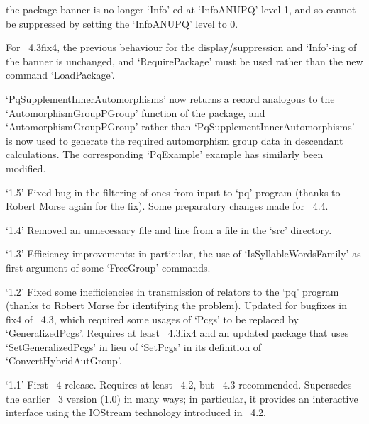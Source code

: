 \itemitem{--}
the package banner is no longer `Info'-ed at `InfoANUPQ' level 1, and  so
cannot be suppressed by setting the `InfoANUPQ' level to 0.

\item{}
For {\GAP}~4.3fix4, the previous behaviour  for  the  display/suppression
and `Info'-ing of the banner is unchanged, and `RequirePackage'  must  be
used rather than the new command `LoadPackage'.

\item{}
`PqSupplementInnerAutomorphisms' now returns a record  analogous  to  the
`AutomorphismGroupPGroup'  function  of  the  {\AutPGrp}   package,   and
`AutomorphismGroupPGroup' rather than `PqSupplementInnerAutomorphisms' is
now used to generate the required automorphism group data  in  descendant
calculations. The corresponding `PqExample' example  has  similarly  been
modified.

\item{`1.5'}
Fixed bug in the filtering of ones from input to `pq' program (thanks  to
Robert Morse again for  the  fix).  Some  preparatory  changes  made  for
{\GAP}~4.4.

\item{`1.4'}
Removed an unnecessary file and line from a file in the `src' directory.

\item{`1.3'}
Efficiency improvements: in particular, the use of `IsSyllableWordsFamily'
as first argument of some `FreeGroup' commands.

\item{`1.2'}
Fixed some inefficiencies in transmission of relators to the `pq' program
(thanks to  Robert  Morse  for  identifying  the  problem).  Updated  for
bugfixes in fix4 of {\GAP}~4.3, which required some usages of  `Pcgs'  to
be replaced by `GeneralizedPcgs'. Requires at least {\GAP}~4.3fix4 and an
updated {\AutPGrp} package that  uses  `SetGeneralizedPcgs'  in  lieu  of
`SetPcgs' in its definition of `ConvertHybridAutGroup'.

\item{`1.1'}
First {\GAP}~4 release. Requires  at  least  {\GAP}~4.2,  but  {\GAP}~4.3
recommended. Supersedes the earlier {\GAP}~3 version (1.0) in many  ways;
in particular, it provides an interactive interface  using  the  IOStream
technology introduced in {\GAP}~4.2.

\endlist


